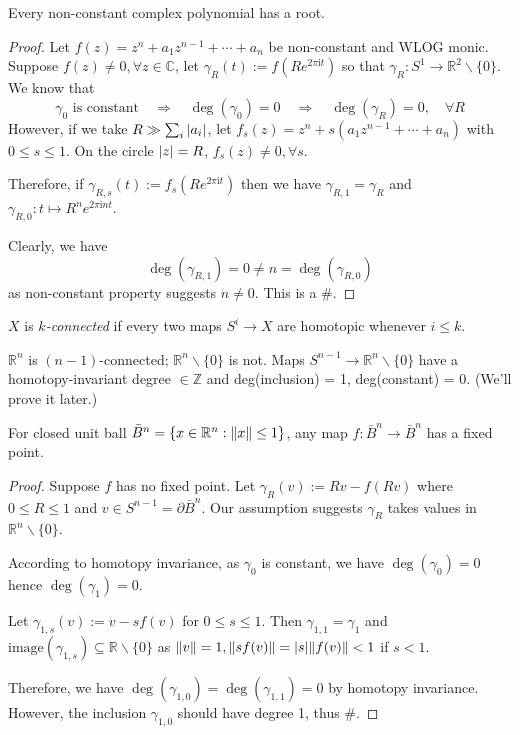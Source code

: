\documentclass[a4paper,11pt]{article}
\begin{document}
	\begin{cor}
		Every non-constant complex polynomial has a root.
	\end{cor}

	\begin{proof}
		Let $f(z) = z^n + a_1 z^{n-1} + \cdots + a_n$ be non-constant and WLOG monic. Suppose $f(z) \neq 0, \forall z \in \mathbb{C}$, let $\gamma_R (t):= f\left( R e^{2\pi \mathrm{i} t} \right)$ so that $\gamma_R : S^1 \to \mathbb{R}^2 \backslash \{0\}$. We know that
		\[
			\gamma_0 \text{ is constant} \quad \Rightarrow\quad \deg(\gamma_0) = 0 \quad \Rightarrow\quad \deg(\gamma_R) = 0, \quad \forall R
		\]
		However, if we take $R \gg \sum_i \abs{a_i}$, let $f_s(z) = z^n + s \left( a_1 z^{n-1} + \cdots + a_n \right)$ with $0 \leq s \leq 1$. On the circle $\abs{z} = R$, $f_s(z) \neq 0, \forall s$.

		Therefore, if $\gamma_{R,s}(t) := f_s\left( R e^{2\pi \mathrm{i} t} \right)$ then we have $\gamma_{R,1} = \gamma_R$ and $\gamma_{R,0} : t \mapsto R^n e^{2\pi \mathrm{i} n t}$.
		
		Clearly, we have
		\[
			\deg(\gamma_{R,1}) = 0 \neq n = \deg(\gamma_{R,0}) 
		\]
		as non-constant property suggests $n \neq 0$. This is a \#.
	\end{proof}

	\begin{defi}
		$X$ is \emph{$k$-connected} if every two maps $S^i \to X$ are homotopic whenever $i \leq k$.
	\end{defi}

	\begin{ex}
		$\mathbb{R}^n$ is $(n-1)$-connected; $\mathbb{R}^n \backslash \{0\}$ is not. Maps $S^{n-1} \to \mathbb{R}^n \backslash \{0\}$ have a homotopy-invariant degree $\in \mathbb{Z}$ and deg(inclusion) = 1, deg(constant) = 0. (We'll prove it later.)
	\end{ex}

	\begin{cor}
		For closed unit ball $\bar{B}^n = \{x\in \mathbb{R}^n : \norm{x}\leq 1\}$, any map $f : \bar{B}^n \to \bar{B}^n$ has a fixed point.
	\end{cor}

	\begin{proof}
		Suppose $f$ has no fixed point. Let $\gamma_R (v) := Rv - f(Rv)$ where $0 \leq R \leq 1$ and $v \in S^{n-1} = \partial \bar{B}^n$. Our assumption suggests $\gamma_R$ takes values in $\mathbb{R}^n \backslash \{0\}$.

		According to homotopy invariance, as $\gamma_0$ is constant, we have $\deg(\gamma_0) = 0$ hence $\deg(\gamma_1) = 0$.
		
		Let $\gamma_{1,s}(v) := v - s f(v)$ for $0 \leq s \leq 1$. Then $\gamma_{1,1} = \gamma_1$ and $\text{image}(\gamma_{1,s}) \subseteq \mathbb{R} \backslash \{0\}$ as $\norm{v} = 1, \norm{s f(v)} = \abs{s}\norm{f(v)} < 1$ if $s < 1$.
		
		Therefore, we have $\deg(\gamma_{1,0}) = \deg(\gamma_{1,1}) = 0$ by homotopy invariance. However, the inclusion $\gamma_{1,0}$ should have degree 1, thus \#.
	\end{proof}
\end{document}
